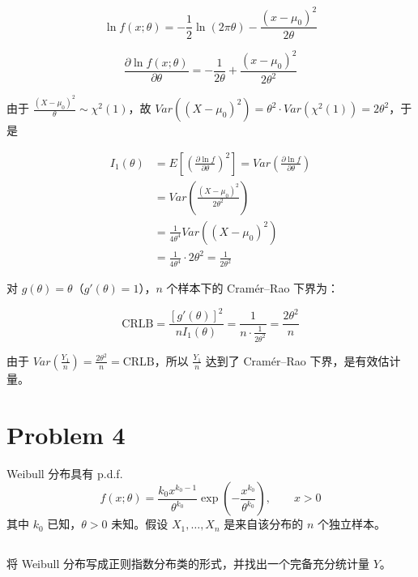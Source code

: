 \documentclass[12pt,a4paper]{article}
\begin{document}
\begin{answerbox}
$$
\ln f(x; \theta) = -\frac{1}{2}\ln(2\pi \theta) - \frac{(x-\mu_0)^2}{2\theta}
$$

$$
\frac{\partial \ln f(x; \theta)}{\partial \theta} = -\frac{1}{2\theta} + \frac{(x-\mu_0)^2}{2\theta^2}
$$

由于 $\frac{(X-\mu_0)^2}{\theta}\sim\chi^2(1)$，故 $Var\left((X-\mu_0)^2\right) = \theta^2 \cdot Var(\chi^2(1)) = 2\theta^2$，于是

$$
\begin{aligned}
I_1(\theta) &= E\left[\left(\frac{\partial \ln f}{\partial \theta}\right)^2\right] = Var\left(\frac{\partial \ln f}{\partial \theta}\right) \\
&= Var\left(\frac{(X-\mu_0)^2}{2\theta^2}\right) \\
&= \frac{1}{4\theta^4} Var\left((X-\mu_0)^2\right) \\
&= \frac{1}{4\theta^4}\cdot 2\theta^2 = \frac{1}{2\theta^2}
\end{aligned}
$$

对 $g(\theta)=\theta$（$g'(\theta)=1$），$n$ 个样本下的 Cramér--Rao 下界为：

$$
\text{CRLB} = \frac{[g'(\theta)]^2}{n I_1(\theta)} = \frac{1}{n\cdot \frac{1}{2\theta^2}} = \frac{2\theta^2}{n}
$$

由于 $Var\left(\frac{Y_1}{n}\right) = \frac{2\theta^2}{n} = \text{CRLB}$，所以 $\frac{Y_1}{n}$ 达到了 Cramér--Rao 下界，是有效估计量。
 
\end{answerbox}

\section{Problem 4}

Weibull 分布具有 p.d.f.
\[
    f(x;\theta)=\frac{k_0 x^{k_0-1}}{\theta^{k_0}}
    \exp\left(-\frac{x^{k_0}}{\theta^{k_0}}\right),\qquad x>0
\]
其中 $k_0$ 已知，$\theta>0$ 未知。假设 $X_1,\ldots,X_n$ 是来自该分布的 $n$ 个独立样本。

\subsection{}

将 Weibull 分布写成正则指数分布类的形式，并找出一个完备充分统计量 $Y$。
\end{document}
